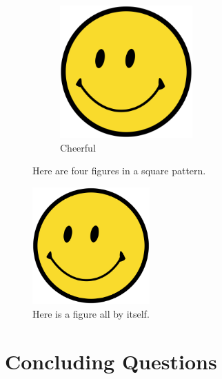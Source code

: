 \documentclass{lab}
\begin{document}
\begin{figure}[ht]
\begin{subfigure}{0.45\textwidth}
    \includegraphics[width=\textwidth,height=2in]{smile}
    \caption{Cheerful}\label{Fig:d_dark}
  \end{subfigure}
  \caption{Here are four figures in a square pattern.}\label{Fig:1}
\end{figure}

\blindtext[2]

\begin{figure}[ht]
  \centering
  \includegraphics[width=0.4\textwidth]{smile}
  \caption{Here is a figure all by itself.}\label{Fig:gel}
\end{figure}

\blindtext[2]

\section{Concluding Questions}
\label{Sec:Con_Questions}
\end{document}
